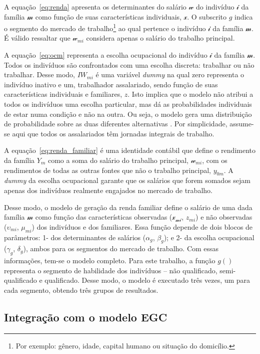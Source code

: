 A equação~\eqref{eq:renda} apresenta os determinantes do salário $\mathcal{w}$ do indivíduo $\mathcal{i}$ da família $\mathcal{m}$ como função de suas características individuais, $\mathcal{x}$. O subscrito $g$ indica o segmento do mercado de trabalho\footnote{Por exemplo: gênero, idade, capital humano ou situação do domicílio.} ao qual pertence o indivíduo $\mathcal{i}$ da família $\mathcal{m}$. É válido ressaltar que  $\mathcal{w}_{mi}$ considera apenas o salário do trabalho principal.

A equação~\eqref{eq:ocm} representa a escolha ocupacional do indivíduo $\mathcal{i}$ da família $\mathcal{m}$. Todos os indivíduos são confrontados com uma escolha discreta: trabalhar ou não trabalhar. Desse modo, $IW_{mi}$ é uma variável \textit{dummy} na qual zero representa o indivíduo inativo e um, trabalhador assalariado, sendo função de suas características individuais e familiares, $z$. Isto implica que o modelo não atribui a todos os indivíduos uma escolha particular, mas dá as probabilidades individuais de estar numa condição e não na outra. Ou seja, o modelo gera uma distribuição de probabilidade sobre as duas diferentes alternativas \cite{colombo08}. Por simplicidade, assume-se aqui que todos os assalariados têm jornadas integrais de trabalho.

A equação~\eqref{eq:renda_familiar} é uma identidade contábil que define o rendimento da família $Y_m$ como a soma do salário do trabalho principal, $\mathcal{w}_{mi}$, com os rendimentos de todas as outras fontes que não o trabalho principal, $y_{0m}$. A \textit{dummy} da escolha ocupacional garante que os salários que forem somados sejam apenas dos indivíduos realmente engajados no mercado de trabalho.

Desse modo, o modelo de geração da renda familiar define o salário de uma dada família $\mathcal{m}$ como função das características observadas ($\mathcal{x_{mi}}$, $z_{mi}$) e não observadas ($\upsilon_{mi}$, $\mu_{mi}$) dos indivíduos e dos familiares. Essa função depende de dois blocos de parâmetros: 1- dos determinantes de salários ($\alpha_g$, $\beta_g$); e 2- da escolha ocupacional ($\gamma_g$, $\delta_g$), ambos para os segmentos do mercado de trabalho. Com essas informações, tem-se o modelo completo. Para este trabalho, a função $g()$ representa o segmento de habilidade dos indivíduos -- não qualificado, semi-qualificado e qualificado. Desse modo, o modelo é executado três vezes, um para cada segmento, obtendo três grupos de resultados.


\subsection{Integração com o modelo EGC}\label{subsec:integracao}

